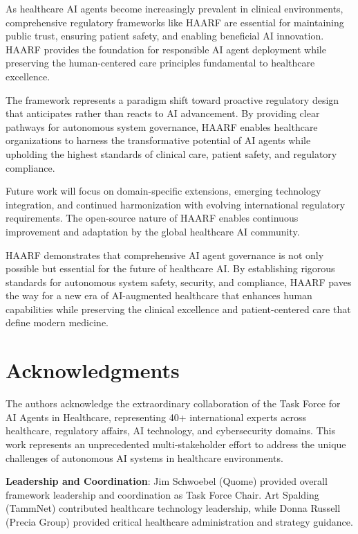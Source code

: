 \documentclass[11pt]{article}
\begin{document}
As healthcare AI agents become increasingly prevalent in clinical environments, comprehensive regulatory frameworks like HAARF are essential for maintaining public trust, ensuring patient safety, and enabling beneficial AI innovation. HAARF provides the foundation for responsible AI agent deployment while preserving the human-centered care principles fundamental to healthcare excellence.

The framework represents a paradigm shift toward proactive regulatory design that anticipates rather than reacts to AI advancement. By providing clear pathways for autonomous system governance, HAARF enables healthcare organizations to harness the transformative potential of AI agents while upholding the highest standards of clinical care, patient safety, and regulatory compliance.

Future work will focus on domain-specific extensions, emerging technology integration, and continued harmonization with evolving international regulatory requirements. The open-source nature of HAARF enables continuous improvement and adaptation by the global healthcare AI community.

HAARF demonstrates that comprehensive AI agent governance is not only possible but essential for the future of healthcare AI. By establishing rigorous standards for autonomous system safety, security, and compliance, HAARF paves the way for a new era of AI-augmented healthcare that enhances human capabilities while preserving the clinical excellence and patient-centered care that define modern medicine.

\section*{Acknowledgments}

The authors acknowledge the extraordinary collaboration of the Task Force for AI Agents in Healthcare, representing 40+ international experts across healthcare, regulatory affairs, AI technology, and cybersecurity domains. This work represents an unprecedented multi-stakeholder effort to address the unique challenges of autonomous AI systems in healthcare environments.

\textbf{Leadership and Coordination}: Jim Schwoebel (Quome) provided overall framework leadership and coordination as Task Force Chair. Art Spalding (TammNet) contributed healthcare technology leadership, while Donna Russell (Precia Group) provided critical healthcare administration and strategy guidance.
\end{document}
